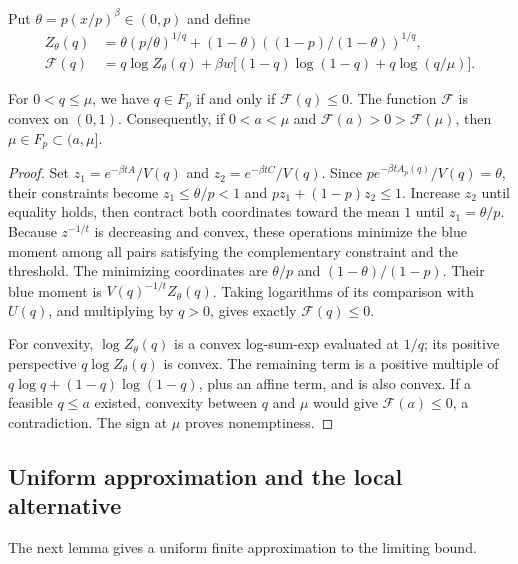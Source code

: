 Put $\theta=p(x/p)^\beta\in(0,p)$ and define
\begin{equation}\label{eq:entropy-test}
 \begin{aligned}
 Z_\theta(q)&=\theta(p/\theta)^{1/q}
       +(1-\theta)((1-p)/(1-\theta))^{1/q},\\
 \mathcal F(q)&=q\log Z_\theta(q)
       +\beta w\bigl[(1-q)\log(1-q)+q\log(q/\mu)\bigr].
 \end{aligned}
\end{equation}

\begin{lemma}\label{lem:feasibility-cutoff}
For $0<q\le\mu$, we have $q\in F_p$ if and only if $\mathcal F(q)\le0$.
The function $\mathcal F$ is convex on $(0,1)$. Consequently, if
$0<a<\mu$ and $\mathcal F(a)>0>\mathcal F(\mu)$, then
$\mu\in F_p\subset(a,\mu]$.
\end{lemma}
\begin{proof}
Set
$z_1=e^{-\beta tA}/V(q)$ and $z_2=e^{-\beta tC}/V(q)$.
Since $p e^{-\beta tA_p(q)}/V(q)=\theta$, their constraints become
$z_1\le\theta/p<1$ and $pz_1+(1-p)z_2\le1$.
Increase $z_2$ until equality holds, then contract both coordinates toward
the mean $1$ until $z_1=\theta/p$. Because $z^{-1/t}$ is decreasing
and convex, these operations minimize the blue moment among all pairs
satisfying the complementary constraint and the threshold.
The minimizing coordinates are $\theta/p$ and $(1-\theta)/(1-p)$.
Their blue moment is $V(q)^{-1/t}Z_\theta(q)$.
Taking logarithms of its comparison with $U(q)$, and multiplying by
$q>0$, gives exactly $\mathcal F(q)\le0$.

For convexity, $\log Z_\theta(q)$ is a convex log-sum-exp evaluated at
$1/q$; its positive perspective $q\log Z_\theta(q)$ is convex.
The remaining term is a positive multiple of
$q\log q+(1-q)\log(1-q)$, plus an affine term, and is also convex.
If a feasible $q\le a$ existed, convexity between $q$ and $\mu$ would
give $\mathcal F(a)\le0$, a contradiction. The sign at $\mu$ proves
nonemptiness.
\end{proof}

\subsection{Uniform approximation and the local alternative}

The next lemma gives a uniform finite approximation to the limiting bound.

